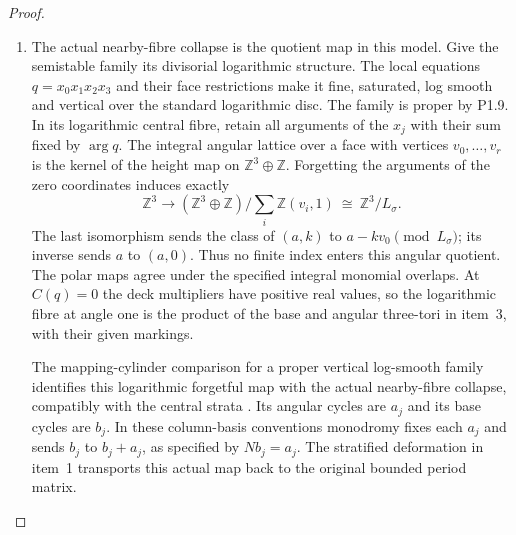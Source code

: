 \documentclass[11pt,a4paper]{article}
\theoremstyle{definition}
\begin{document}
\begin{proof}
\begin{enumerate}[label=\arabic*.]
The period deck map is $(a,k)\mapsto(a+k\nu,k)$, sending $v$ to
$v+\nu$.  Its component marking is unchanged because
$a+k\nu-k(v+\nu)=a-kv$.
Moreover $\mathcal A_{v+\nu}=\mathcal A_v+2G\nu$; the common
character factor cancels in projective ratios.  Hence
\[
 \mu_{v+\nu}(T_\nu p)=\mu_v(p)+G\nu,
 \qquad s_{v+\nu}(y+G\nu)=T_\nu s_v(y).
\]
These give an explicit well-defined map
\[
 \begin{gathered}
 \mathcal Q=
 \bigl((\mathbb R^3/G\mathbb Z^3)\times
       (\mathbb R^3/\mathbb Z^3)\bigr)/\!\sim
 \longrightarrow C,\\
 [y,\theta]\longmapsto e^{2\pi i\theta}\,s_v(y)
 \quad(y\in P_v).
 \end{gathered}
\]
where over $\operatorname{relint}D_\sigma$ the relation collapses
the subtorus $L_\sigma\otimes(\mathbb R/\mathbb Z)$.
On each stratum the inverse takes its moment value and its angular
character class in $T_A/T_{L_\sigma}$; the latter is obtained by
$z\mapsto z/|z|$ on its nonzero characters.
The map is a continuous bijection, and its source is compact and
$C$ Hausdorff, so it is a homeomorphism.
The angular identity $[y,0]$ gives the continuous section, with
the same face and deck compatibilities just proved.

\item The actual nearby-fibre collapse is the quotient map in this model.
Give the semistable family its divisorial logarithmic structure.
The local equations $q=x_0x_1x_2x_3$ and their face restrictions
make it fine, saturated, log smooth and vertical over the standard
logarithmic disc.  The family is proper by P1.9.
In its logarithmic central fibre, retain all arguments of the $x_j$
with their sum fixed by $\arg q$.  The integral angular lattice over
a face with vertices $v_0,\ldots,v_r$ is the kernel of the height
map on $\mathbb Z^3\oplus\mathbb Z$.  Forgetting the arguments of
the zero coordinates induces exactly
\[
 \mathbb Z^3\longrightarrow
 (\mathbb Z^3\oplus\mathbb Z)/
       \sum_i\mathbb Z(v_i,1)
 \ \cong\ \mathbb Z^3/L_\sigma.
\]
The last isomorphism sends the class of $(a,k)$ to
$a-kv_0\pmod {L_\sigma}$; its inverse sends $a$ to $(a,0)$.
Thus no finite index enters this angular quotient.
The polar maps agree under the specified integral monomial overlaps.
At $C(q)=0$ the deck multipliers have positive real values, so the
logarithmic fibre at angle one is the product of the base and angular
three-tori in item~3, with their given markings.

The mapping-cylinder comparison for a proper vertical log-smooth
family identifies this logarithmic forgetful map with the actual
nearby-fibre collapse, compatibly with the central strata
\cite[formula (3-3-1), p.~478; Theorem 4.1.1 and Lemmas
4.1.2--4.1.3, pp.~480--482]{ffAchingerOgus20}.
Its angular cycles are $a_j$ and its base cycles are $b_j$.
In these column-basis conventions monodromy fixes each $a_j$
and sends $b_j$ to $b_j+a_j$, as specified by $Nb_j=a_j$.
The stratified deformation in item~1 transports this actual map
back to the original bounded period matrix.


\end{enumerate}
\end{proof}
\end{document}
